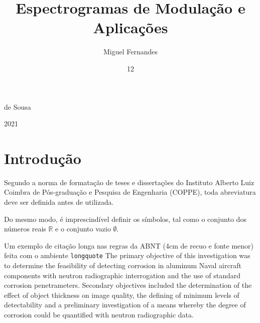 \documentclass[tcc,numbers]{coppe}
\begin{document}
    \title{Espectrogramas de Modulação e Aplicações}
    \author{Miguel Fernandes}{de Sousa}
    
    \date{12}{2021}
    
    
    \maketitle
    
    \frontmatter

    
    
    
    
    
    
    \tableofcontents
    \listoffigures
    \listoftables
    \printloabbreviations
    \printlosymbols
    
    \mainmatter
    \chapter{Introdu{\c c}\~ao}
    
    Segundo a norma de formata{\c c}\~ao de teses e disserta{\c c}\~oes do
    Instituto Alberto Luiz Coimbra de P\'os-gradua{\c c}\~ao e Pesquisa de
    Engenharia (COPPE), toda abreviatura deve ser definida antes de
    utilizada.
    
    Do mesmo modo, \'e imprescind\'ivel definir os s\'imbolos, tal como o
    conjunto dos n\'umeros reais $\mathbb{R}$ e o conjunto vazio $\emptyset$.
    
    \begin{longquote}
    Um exemplo de citação longa nas regras da ABNT (4cm de recuo e fonte menor)
    feita com o ambiente  \verb=longquote= The primary objective of this
    investigation was to determine the feasibility of detecting corrosion in
    aluminum Naval aircraft components with neutron radiographic interrogation
    and the use of standard corrosion penetrameters. Secondary objectives
    included the determination of the effect of object thickness on image quality,
    the defining of minimum levels of detectability and a preliminary investigation
    of a means whereby the degree of corrosion could be quantified with neutron
    radiographic data.
    \end{longquote}
    
\end{document}
